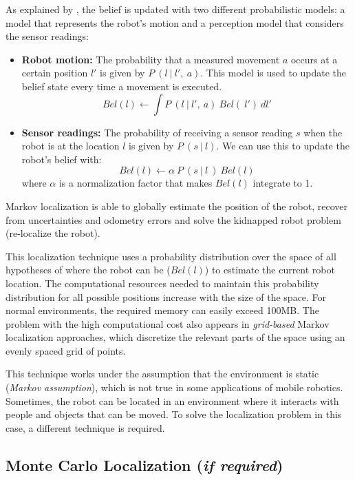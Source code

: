 As explained by \citet{Montecarlo}, the belief is updated with two different probabilistic models: a model that represents the robot's motion and a perception model that considers the sensor readings:
\begin{itemize}
	\item \textbf{Robot motion:} The probability that a measured movement $a$ occurs at a certain position $l'$ is given by $P\ (l\ |\ l',\ a)$. This model is used to update the belief state every time a movement is executed.
	\begin{equation}
	Bel(l) \leftarrow \int P\ (l\ |\ l',\ a)\ Bel(\ l')\ dl' 
	\end{equation}
	\item \textbf{Sensor readings:} The probability of receiving a sensor reading $s$ when the robot is at the location $l$ is given by $P\ (s\ |\ l)$. We can use this to update the robot's belief with:
	\begin{equation}
	Bel(l) \leftarrow \alpha \ P\  (s \ |\ l \ )\ Bel(l)
	\end{equation}
	where $\alpha$ is a normalization factor that makes $Bel(l)$ integrate to 1.
\end{itemize}

Markov localization is able to globally estimate the position of the robot, recover from uncertainties and odometry errors and solve the kidnapped robot problem (re-localize the robot). 

This localization technique uses a probability distribution over the space of all hypotheses of where the robot can be ($Bel(l)$) to estimate the current robot location. The computational resources needed to maintain this probability distribution for all possible positions increase with the size of the space. For normal environments, the required memory can easily exceed 100MB. The problem with the high computational cost also appears in \textit{grid-based} Markov localization approaches, which discretize the relevant parts of the space using an evenly spaced grid of points.

This technique works under the assumption that the environment is static (\textit{Markov assumption}), which is not true in some applications of mobile robotics. Sometimes, the robot can be located in an environment where it interacts with people and objects that can be moved. To solve the localization problem in this case, a different technique is required.

\subsection{Monte Carlo Localization (\textit{if required})}

